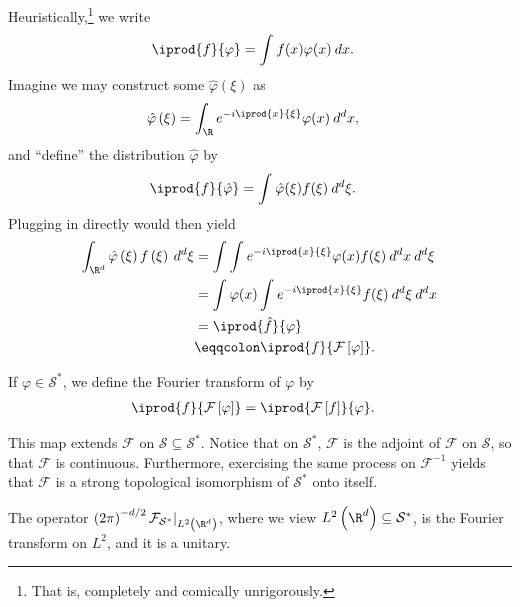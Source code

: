 \documentclass[10pt]{mypackage}
\renewcommand{\eqcolon}{\eqqcolon}
\begin{document}
Heuristically,\footnote{That is, completely and comically unrigorously.} we write
\begin{align*}
  \iprod{f}{\varphi} &= \int_{}^{} f(x)\varphi(x)\:dx.
\end{align*}
Imagine we may construct some $\hat{\varphi}\left( \xi \right)$ as
\begin{align*}
  \hat{\varphi}\left( \xi \right) &= \int_{\R}^{} e^{-i \iprod{x}{\xi}}\varphi(x)\:d^{d}x,
\end{align*}
and ``define'' the distribution $\hat{\varphi}$ by
\begin{align*}
  \iprod{f}{\hat{\varphi}} &= \int_{}^{} \hat{\varphi}(\xi)f(\xi)\:d^{d}\xi.
\end{align*}
Plugging in directly would then yield
\begin{align*}
  \int_{\R^d}^{} \hat{\varphi}\left( \xi \right)f\left( \xi \right)\:d^{d}\xi &= \int_{}^{} \int_{}^{} e^{-i \iprod{x}{\xi}}\varphi(x)f(\xi)\:d^{d}x\:d^{d}\xi\\
                                                                              &= \int_{}^{}\varphi(x) \int_{}^{} e^{-i \iprod{x}{\xi}}f(\xi)\:d^{d}\xi\:d^{d}x\\
                                                                              &= \iprod{\hat{f}}{\varphi}\\
                                                                              &\eqcolon \iprod{f}{\mathcal{F}\left[ \varphi \right]}.
\end{align*}
\begin{definition}
  If $\varphi\in \mathcal{S}^{\ast}$, we define the Fourier transform of $\varphi$ by
  \begin{align*}
    \iprod{f}{\mathcal{F}\left[ \varphi \right]} &= \iprod{\mathcal{F}\left[ f \right]}{\varphi}.
  \end{align*}
\end{definition}
This map extends $\mathcal{F}$ on $\mathcal{S}\subseteq \mathcal{S}^{\ast}$. Notice that on $\mathcal{S}^{\ast}$, $\mathcal{F}$ is the adjoint of $\mathcal{F}$ on $\mathcal{S}$, so that $\mathcal{F}$ is continuous. Furthermore, exercising the same process on $\mathcal{F}^{-1}$ yields that $\mathcal{F}$ is a strong topological isomorphism of $\mathcal{S}^{\ast}$ onto itself.
\begin{remark}
  The operator $\left( 2\pi \right)^{-d/2}\mathcal{F}_{\mathcal{S}^{\ast}}|_{L^2\left( \R^d \right)}$, where we view $L^2\left( \R^d \right)\subseteq \mathcal{S}^{\ast}$, is the Fourier transform on $L^2$, and it is a unitary.
\end{remark}
\end{document}
